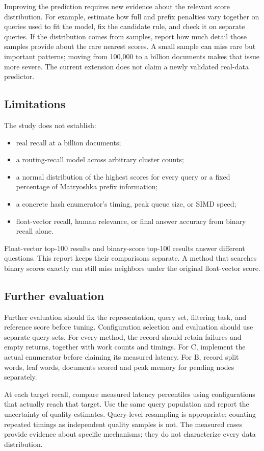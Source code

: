 Improving the prediction requires new evidence about the relevant score distribution. For
example, estimate how full and prefix penalties vary together on queries used to fit the model, fix the
candidate rule, and check it on separate queries. If the distribution comes from samples, report
how much detail those samples provide about the rare nearest scores. A small sample can miss rare but
important patterns; moving from 100,000 to a billion documents makes that issue more severe.
The current extension does not claim a newly validated real-data predictor.

\subsection{Limitations}
The study does not establish:
\begin{itemize}
\item real recall at a billion documents;
\item a routing-recall model across arbitrary cluster counts;
\item a normal distribution of the highest scores for every query or a fixed percentage of Matryoshka prefix information;
\item a concrete hash enumerator's timing, peak queue size, or SIMD speed;
\item float-vector recall, human relevance, or final answer accuracy from binary recall alone.
\end{itemize}
Float-vector top-100 results and binary-score top-100 results answer different questions.
This report keeps their comparisons separate. A method that searches binary scores exactly
can still miss neighbors under the original float-vector score.

\subsection{Further evaluation}
Further evaluation should fix the representation, query set, filtering task, and reference
score before tuning. Configuration selection and evaluation should use separate query sets.
For every method, the record should retain failures and empty returns, together with work
counts and timings. For C, implement the actual enumerator
before claiming its measured latency. For B, record split words, leaf words, documents scored
and peak memory for pending nodes separately.

At each target recall, compare measured latency percentiles using configurations that actually
reach that target. Use the same query population and report the uncertainty of quality estimates.
Query-level resampling is appropriate; counting repeated timings as independent quality samples
is not. The measured cases provide evidence about specific mechanisms; they do not characterize
every data distribution.

